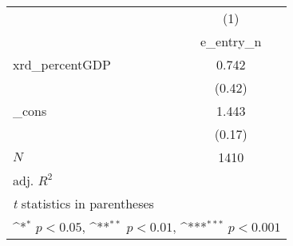 {
\def\sym#1{\ifmmode^{#1}\else\(^{#1}\)\fi}
\begin{tabular}{l*{1}{c}}
\toprule
            &\multicolumn{1}{c}{(1)}\\
            &\multicolumn{1}{c}{e\_entry\_n}\\
\midrule
xrd\_percentGDP&       0.742         \\
            &      (0.42)         \\
\addlinespace
\_cons      &       1.443         \\
            &      (0.17)         \\
\midrule
\(N\)       &        1410         \\
adj. \(R^{2}\)&                     \\
\bottomrule
\multicolumn{2}{l}{\footnotesize \textit{t} statistics in parentheses}\\
\multicolumn{2}{l}{\footnotesize \sym{*} \(p<0.05\), \sym{**} \(p<0.01\), \sym{***} \(p<0.001\)}\\
\end{tabular}
}
